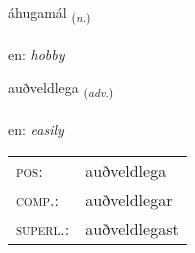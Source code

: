 \documentclass[frontgrid, backgrid]{flacards}\usepackage[]{graphicx}\usepackage[]{xcolor}
\begin{document}
\renewcommand{\flhead}{\vskip5pt \fboxsep=0pt {\small\bfseries\footnotesize Nafnorð | Noun}}
\renewcommand{\fcfoot}{\vskip5pt \fboxsep=0pt \hspace{2pt}{\small\bfseries\footnotesize 3K}}

\renewcommand{\blhead}{\vskip5pt {\small\bfseries\footnotesize Nafnorð | Noun }}
\renewcommand{\bcfoot}{\vskip5pt \hspace{2pt}{\small\bfseries\footnotesize 3K}}


{áhugamál \small{\textsubscript{(\textit{n.})}} \\[1ex] %
\textphonetic{[auːhʏɣamaul]} \\
en: \emph{hobby} \\  [2ex]
\renewcommand*{\arraystretch}{0.8}
}

\renewcommand{\flhead}{\vskip5pt \fboxsep=0pt {\small\bfseries\footnotesize Atviksorð | Adverb}}
\renewcommand{\fcfoot}{\vskip5pt \fboxsep=0pt \hspace{2pt}{\small\bfseries\footnotesize 3K}}

\renewcommand{\blhead}{\vskip5pt {\small\bfseries\footnotesize Atviksorð | Adverb }}
\renewcommand{\bcfoot}{\vskip5pt \hspace{2pt}{\small\bfseries\footnotesize 3K}}


{auðveldlega \small{\textsubscript{(\textit{adv.})}} \\[1ex] %
\textphonetic{[œiðvɛltlɛɣa]} \\
en: \emph{easily} \\  [2ex]
\renewcommand*{\arraystretch}{0.8}
\begin{tabular}{ll}
\textsc{pos}: & auðveldlega \\ 
\textsc{comp.}: & auðveldlegar \\ 
\textsc{superl.}: & auðveldlegast \\
\end{tabular}
}
\end{document}
